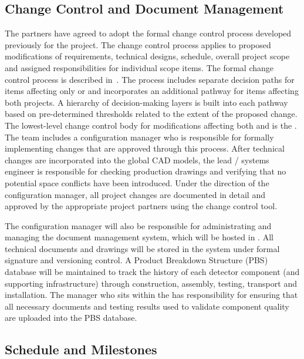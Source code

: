 \subsection{Change Control and Document Management}
\label{sec:dune_changecontrol}

The  partners have agreed to adopt the formal change
control process developed previously for the  project.
The change control process applies to proposed modifications of
requirements, technical designs, schedule, overall project scope and
assigned responsibilities for individual scope items.  The formal
 change control process is described in~. %
The process includes separate decision paths for items affecting only
 or  and incorporates an additional pathway
for items affecting both projects.  A hierarchy of decision-making
layers is built into each pathway based on pre-determined thresholds
related to the extent of the proposed change.  The lowest-level change
control body for modifications affecting both  and
 is the .  The  team includes a
configuration manager who is responsible for formally implementing
changes that are approved through this process.  After technical
changes are incorporated into the global \threed CAD models, the lead
/ systems engineer is responsible for checking production
drawings and verifying that no potential space conflicts have been
introduced.  Under the direction of the configuration manager, all
project changes are documented in detail and approved %
by the
appropriate project partners using the  change control tool.

The configuration manager will also be responsible for administrating
and managing the  document management system, which will
be hosted in .  All technical documents and drawings will be
stored in the  system under formal signature and
versioning control.  A Product Breakdown Structure (PBS) database will
be maintained to track the history of each detector  component (and supporting
infrastructure) through construction, assembly, testing, %
transport and installation.  The   manager who
sits within the  has responsibility for ensuring that all
necessary documents and testing results used to validate component
quality are uploaded into the PBS database.

\subsection{Schedule and Milestones}
\label{sec:dune_schedule}

